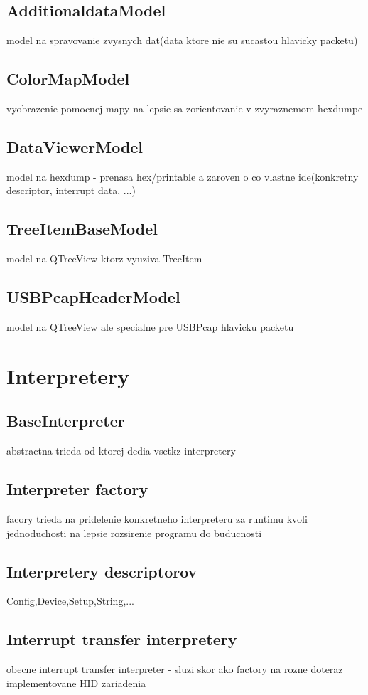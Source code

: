 \subsection{AdditionaldataModel}
model na spravovanie zvysnych dat(data ktore nie su sucastou hlavicky packetu)
\subsection{ColorMapModel}
vyobrazenie pomocnej mapy na lepsie sa zorientovanie v zvyraznemom hexdumpe
\subsection{DataViewerModel}
model na hexdump - prenasa hex/printable a zaroven o co vlastne ide(konkretny descriptor, interrupt data, ...)
\subsection{TreeItemBaseModel}
model na QTreeView ktorz vyuziva TreeItem
\subsection{USBPcapHeaderModel}
model na QTreeView ale specialne pre USBPcap hlavicku packetu
\section{Interpretery}
\subsection{BaseInterpreter}
abstractna trieda od ktorej dedia vsetkz interpretery
\subsection{Interpreter factory}
facory trieda na pridelenie konkretneho interpreteru za runtimu kvoli jednoduchosti na lepsie rozsirenie programu do buducnosti
\subsection{Interpretery descriptorov}
Config,Device,Setup,String,...
\subsection{Interrupt transfer interpretery}
obecne interrupt transfer interpreter - sluzi skor ako factory na rozne doteraz implementovane HID zariadenia

